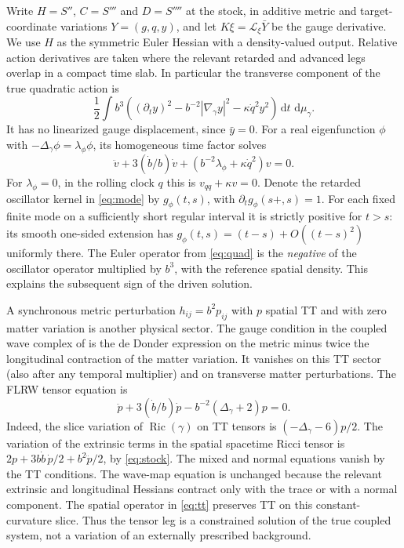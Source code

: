 \documentclass[11pt]{article}
\newcommand{\dd}{\,\mathrm d}
\newcommand{\Ric}{\operatorname{Ric}}
\newcommand{\Lie}{\mathcal L}
\numberwithin{equation}{section}
\begin{document}
Write $H=S''$, $C=S'''$ and $D=S''''$ at the stock, in additive metric and target-coordinate variations $Y=(g,q,y)$, and let $K\xi=\Lie_\xi\bar Y$ be the gauge derivative. We use $H$ as the symmetric Euler Hessian with a density-valued output. Relative action derivatives are taken where the relevant retarded and advanced legs overlap in a compact time slab. In particular the transverse component of the true quadratic action is
\begin{equation}
 \frac12\int b^3\left((\partial_t y)^2-b^{-2}|\nabla_\gamma y|^2
                                -\kappa \dot q^2 y^2\right)\dd t\,\dd\mu_\gamma .
 \label{eq:quad}
\end{equation}
It has no linearized gauge displacement, since $\bar y=0$. For a real eigenfunction $\phi$ with $-\Delta_\gamma\phi=\lambda_\phi\phi$, its homogeneous time factor solves
\begin{equation}
 \ddot v+3(\dot b/b)\dot v+
          (b^{-2}\lambda_\phi+\kappa\dot q^2)v=0.
 \label{eq:mode}
\end{equation}
For $\lambda_\phi=0$, in the rolling clock $q$ this is $v_{qq}+\kappa v=0$. Denote the retarded oscillator kernel in \eqref{eq:mode} by $g_\phi(t,s)$, with $\partial_t g_\phi(s+,s)=1$. For each fixed finite mode on a sufficiently short regular interval it is strictly positive for $t>s$: its smooth one-sided extension has
$g_\phi(t,s)=(t-s)+O((t-s)^2)$ uniformly there. The Euler operator from \eqref{eq:quad} is the \emph{negative} of the oscillator operator multiplied by $b^3$, with the reference spatial density. This explains the subsequent sign of the driven solution.

A synchronous metric perturbation $h_{ij}=b^2p_{ij}$ with $p$ spatial TT and with zero matter variation is another physical sector. The gauge condition in the coupled wave complex of \cite{p71} is the de Donder expression on the metric minus twice the longitudinal contraction of the matter variation. It vanishes on this TT sector (also after any temporal multiplier) and on transverse matter perturbations. The FLRW tensor equation is
\begin{equation}
 \ddot p+3(\dot b/b)\dot p-b^{-2}(\Delta_\gamma+2)p=0 .
 \label{eq:tt}
\end{equation}
Indeed, the slice variation of $\Ric(\gamma)$ on TT tensors is $(-\Delta_\gamma-6)p/2$. The variation of the extrinsic terms in the spatial spacetime Ricci tensor is
$2p+3b\dot b\,\dot p/2+b^2\ddot p/2$, by \eqref{eq:stock}. The mixed and normal equations vanish by the TT conditions. The wave-map equation is unchanged because the relevant extrinsic and longitudinal Hessians contract only with the trace or with a normal component. The spatial operator in \eqref{eq:tt} preserves TT on this constant-curvature slice. Thus the tensor leg is a constrained solution of the true coupled system, not a variation of an externally prescribed background.
\end{document}
